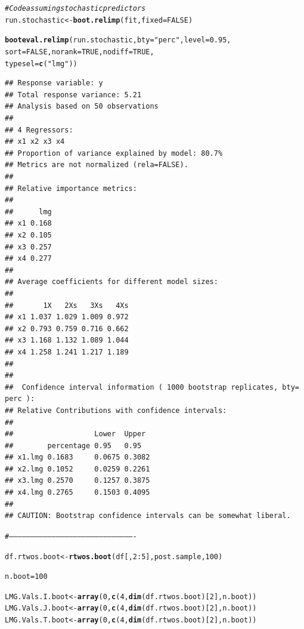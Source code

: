 \documentclass[11pt,a4paper,twoside]{book}
\makeatletter
\newcommand{\hlnum}[1]{\textcolor[rgb]{0.686,0.059,0.569}{#1}}%
\newcommand{\hlstr}[1]{\textcolor[rgb]{0.192,0.494,0.8}{#1}}%
\newcommand{\hlcom}[1]{\textcolor[rgb]{0.678,0.584,0.686}{\textit{#1}}}%
\newcommand{\hlopt}[1]{\textcolor[rgb]{0,0,0}{#1}}%
\newcommand{\hlstd}[1]{\textcolor[rgb]{0.345,0.345,0.345}{#1}}%
\newcommand{\hlkwb}[1]{\textcolor[rgb]{0.69,0.353,0.396}{#1}}%
\newcommand{\hlkwc}[1]{\textcolor[rgb]{0.333,0.667,0.333}{#1}}%
\newcommand{\hlkwd}[1]{\textcolor[rgb]{0.737,0.353,0.396}{\textbf{#1}}}%
\newenvironment{kframe}{%
 \def\at@end@of@kframe{}%
 \ifinner\ifhmode%
  \def\at@end@of@kframe{\end{minipage}}%
  \begin{minipage}{\columnwidth}%
 \fi\fi%
 \def\FrameCommand##1{\hskip\@totalleftmargin \hskip-\fboxsep
 \colorbox{shadecolor}{##1}\hskip-\fboxsep
     \hskip-\linewidth \hskip-\@totalleftmargin \hskip\columnwidth}%
 \MakeFramed {\advance\hsize-\width
   \@totalleftmargin\z@ \linewidth\hsize
   \@setminipage}}%
 {\par\unskip\endMakeFramed%
 \at@end@of@kframe}
\newenvironment{knitrout}{}{} %
\makeatother
\begin{document}
\begin{knitrout}
\color{fgcolor}\begin{kframe}
\begin{alltt}
\hlcom{#Code assuming stochastic predictors}
\hlstd{run.stochastic}\hlkwb{<-}\hlkwd{boot.relimp}\hlstd{(fit,} \hlkwc{fixed}\hlstd{=}\hlnum{FALSE}\hlstd{)}

\hlkwd{booteval.relimp}\hlstd{(run.stochastic,} \hlkwc{bty} \hlstd{=} \hlstr{"perc"}\hlstd{,} \hlkwc{level} \hlstd{=} \hlnum{0.95}\hlstd{,}
                \hlkwc{sort} \hlstd{=} \hlnum{FALSE}\hlstd{,} \hlkwc{norank} \hlstd{=} \hlnum{TRUE}\hlstd{,} \hlkwc{nodiff} \hlstd{=} \hlnum{TRUE}\hlstd{,}
                \hlkwc{typesel} \hlstd{=} \hlkwd{c}\hlstd{(}\hlstr{"lmg"}\hlstd{))}
\end{alltt}
\begin{verbatim}
## Response variable: y 
## Total response variance: 5.21 
## Analysis based on 50 observations 
## 
## 4 Regressors: 
## x1 x2 x3 x4 
## Proportion of variance explained by model: 80.7%
## Metrics are not normalized (rela=FALSE). 
## 
## Relative importance metrics: 
## 
##      lmg
## x1 0.168
## x2 0.105
## x3 0.257
## x4 0.277
## 
## Average coefficients for different model sizes: 
## 
##       1X   2Xs   3Xs   4Xs
## x1 1.037 1.029 1.009 0.972
## x2 0.793 0.759 0.716 0.662
## x3 1.168 1.132 1.089 1.044
## x4 1.258 1.241 1.217 1.189
## 
##  
##  Confidence interval information ( 1000 bootstrap replicates, bty= perc ): 
## Relative Contributions with confidence intervals: 
##  
##                   Lower  Upper
##        percentage 0.95   0.95  
## x1.lmg 0.1683     0.0675 0.3082
## x2.lmg 0.1052     0.0259 0.2261
## x3.lmg 0.2570     0.1257 0.3875
## x4.lmg 0.2765     0.1503 0.4095
## 
## CAUTION: Bootstrap confidence intervals can be somewhat liberal.
\end{verbatim}
\begin{alltt}
\hlcom{#----------------------------------------------------------------------------------------}


\hlstd{df.rtwos.boot} \hlkwb{<-}\hlkwd{rtwos.boot}\hlstd{(df[,}\hlnum{2}\hlopt{:}\hlnum{5}\hlstd{], post.sample,} \hlnum{100}\hlstd{)}

\hlstd{n.boot} \hlkwb{=} \hlnum{100}

\hlstd{LMG.Vals.I.boot}\hlkwb{<-}\hlkwd{array}\hlstd{(}\hlnum{0}\hlstd{,} \hlkwd{c}\hlstd{(}\hlnum{4}\hlstd{,}\hlkwd{dim}\hlstd{(df.rtwos.boot)[}\hlnum{2}\hlstd{], n.boot))}
\hlstd{LMG.Vals.J.boot}\hlkwb{<-}\hlkwd{array}\hlstd{(}\hlnum{0}\hlstd{,} \hlkwd{c}\hlstd{(}\hlnum{4}\hlstd{,}\hlkwd{dim}\hlstd{(df.rtwos.boot)[}\hlnum{2}\hlstd{], n.boot))}
\hlstd{LMG.Vals.T.boot}\hlkwb{<-}\hlkwd{array}\hlstd{(}\hlnum{0}\hlstd{,} \hlkwd{c}\hlstd{(}\hlnum{4}\hlstd{,}\hlkwd{dim}\hlstd{(df.rtwos.boot)[}\hlnum{2}\hlstd{], n.boot))}


\end{alltt}
\end{kframe}
\end{knitrout}
\end{document}

